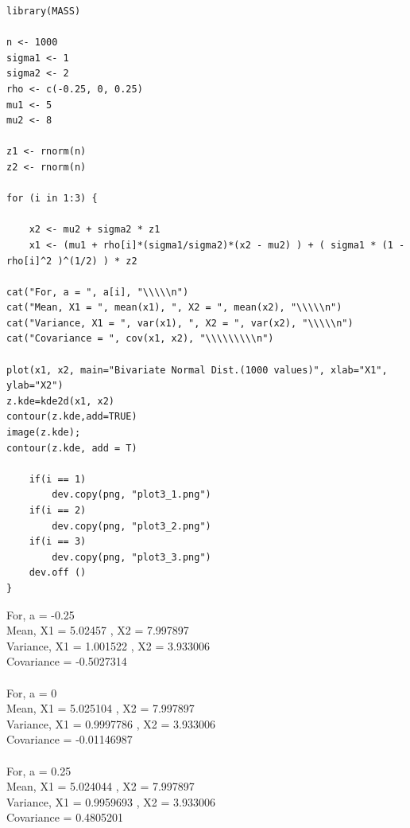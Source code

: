 \documentclass{article}
\begin{document}

\begin{lstlisting}
library(MASS)

n <- 1000
sigma1 <- 1
sigma2 <- 2
rho <- c(-0.25, 0, 0.25)
mu1 <- 5
mu2 <- 8

z1 <- rnorm(n)
z2 <- rnorm(n)

for (i in 1:3) {
	
	x2 <- mu2 + sigma2 * z1
	x1 <- (mu1 + rho[i]*(sigma1/sigma2)*(x2 - mu2) ) + ( sigma1	* (1 - rho[i]^2 )^(1/2) ) * z2

cat("For, a = ", a[i], "\\\\\n")
cat("Mean, X1 = ", mean(x1), ", X2 = ", mean(x2), "\\\\\n")
cat("Variance, X1 = ", var(x1), ", X2 = ", var(x2), "\\\\\n")
cat("Covariance = ", cov(x1, x2), "\\\\\\\\\n")

plot(x1, x2, main="Bivariate Normal Dist.(1000 values)", xlab="X1", ylab="X2")
z.kde=kde2d(x1, x2)
contour(z.kde,add=TRUE) 
image(z.kde); 
contour(z.kde, add = T)

	if(i == 1)
		dev.copy(png, "plot3_1.png")
	if(i == 2)
		dev.copy(png, "plot3_2.png")
	if(i == 3)
		dev.copy(png, "plot3_3.png")
	dev.off ()
}
\end{lstlisting}

For, a =  -0.25 \\
Mean, X1 =  5.02457 , X2 =  7.997897 \\
Variance, X1 =  1.001522 , X2 =  3.933006 \\
Covariance =  -0.5027314 \\\\
For, a =  0 \\
Mean, X1 =  5.025104 , X2 =  7.997897 \\
Variance, X1 =  0.9997786 , X2 =  3.933006 \\
Covariance =  -0.01146987 \\\\
For, a =  0.25 \\
Mean, X1 =  5.024044 , X2 =  7.997897 \\
Variance, X1 =  0.9959693 , X2 =  3.933006 \\
Covariance =  0.4805201 \\\\
\end{document}
